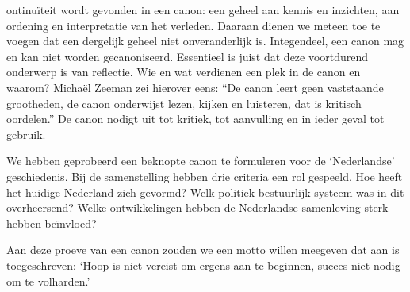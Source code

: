 \documentclass[12pt]{memoir}
\begin{document}
\skp{}ontinu\"iteit wordt \skp[2]
gevonden in een canon: een geheel aan kennis en inzichten, aan ordening en
interpretatie van het verleden. Daaraan dienen we meteen toe te voegen dat een
dergelijk geheel niet onveranderlijk is. Integendeel, een canon mag en kan niet
worden gecanoniseerd. Essentieel is juist dat deze voortdurend onderwerp is van
reflectie. Wie en wat verdienen een plek in de canon en waarom? Micha\"el Zeeman
zei hierover eens: ``De canon leert geen vaststaande grootheden, de canon
onderwijst lezen, kijken en luisteren, dat is kritisch oordelen.'' De canon
nodigt uit tot kritiek, tot aanvulling en in ieder geval tot gebruik.

We hebben geprobeerd een beknopte canon te
formuleren voor de `Nederlandse' geschiedenis. Bij de samenstelling hebben drie
criteria een rol gespeeld. Hoe heeft het huidige Nederland zich gevormd? Welk
politiek-bestuurlijk systeem was in dit  overheersend? Welke
ontwikkelingen hebben de Nederlandse samenleving sterk hebben be\"invloed?

Aan deze proeve van een canon zouden we een motto willen meegeven dat aan
 is
toegeschreven: `Hoop is niet vereist om ergens aan te beginnen, succes niet
nodig om te volharden.'
\end{document}
